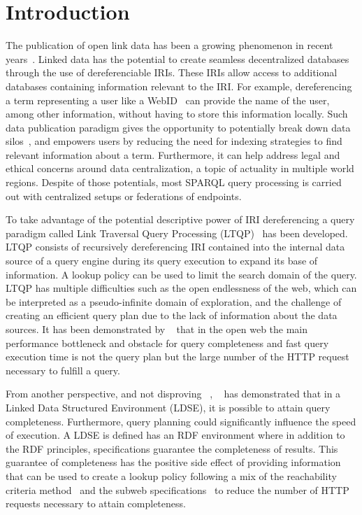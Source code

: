 \section{Introduction}

The publication of open link data has been a growing phenomenon in recent years~\cite{papadaki2018interactive}.
Linked data has the potential to create seamless decentralized databases through the use of dereferenciable IRIs.
These IRIs allow access to additional databases containing information relevant to the IRI.
For example, dereferencing a term representing a user like a WebID~ can provide the name of the user, among other information, without having 
to store this information locally.
Such data publication paradigm gives the opportunity to potentially break down data silos~\cite{verstraete2022solid},
and empowers users by reducing the need for indexing strategies to find relevant information about a term. 
Furthermore,  it can help address legal and ethical concerns around data centralization, a topic of actuality in multiple world regions.
Despite  of those potentials, most SPARQL query processing is carried out with centralized setups or federations of endpoints.

To take advantage of the potential descriptive power of IRI dereferencing a query paradigm called Link Traversal Query Processing (LTQP)~\cite{Hartig2012} has been developed.
LTQP consists of recursively dereferencing IRI contained into the internal data source of a query engine during its query execution to expand its base of information.
A lookup policy can be used to limit the search domain of the query.
LTQP has multiple difficulties such as the open endlessness of the web, which can be interpreted as a pseudo-infinite domain of exploration,
and the challenge of creating an efficient query plan due to the lack of information about the data sources. 
It has been demonstrated by ~\citeauthor{hartig2016walking} that in the open web the main performance bottleneck and obstacle for query completeness and fast query execution time is not the query plan but the large number of the HTTP request necessary to fulfill a query.

From another perspective, and not disproving ~\citeauthor{hartig2016walking}, 
~\citeauthor{Taelman2023} has demonstrated that in a Linked Data Structured Environment (LDSE),
it is possible to attain query completeness.
Furthermore, query planning could significantly influence the speed of execution.
A LDSE is defined has an RDF environment where in addition to the RDF principles, specifications
guarantee the completeness of results.
This guarantee of completeness has the positive side effect of providing information
that can be used to create a lookup policy following a mix of the reachability criteria method~\cite{Hartig2012, Taelman2023} and the subweb specifications~\cite{Bogaerts2021LinkTW}
to reduce the number of HTTP requests necessary to attain completeness.

